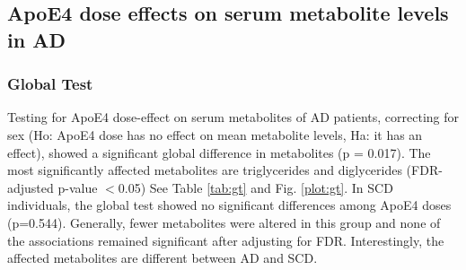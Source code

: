 \documentclass{amsart}
\begin{document}
\subsection{ApoE4 dose effects on serum metabolite levels in AD}
\subsubsection{Global Test}
Testing for ApoE4 dose-effect on serum metabolites of AD patients, correcting for sex (Ho: ApoE4 dose has no effect on mean metabolite levels, Ha: it has an effect), showed a significant global difference in metabolites (p = 0.017). The most significantly affected metabolites are triglycerides and diglycerides (FDR-adjusted p-value $<$0.05) See Table \ref{tab:gt} and Fig. \ref{plot:gt}. In SCD individuals, the global test showed no significant differences among ApoE4 doses (p=0.544). Generally, fewer metabolites were altered in this group and none of the associations remained significant after adjusting for FDR. Interestingly, the affected metabolites are different between AD and SCD.
\end{document}
